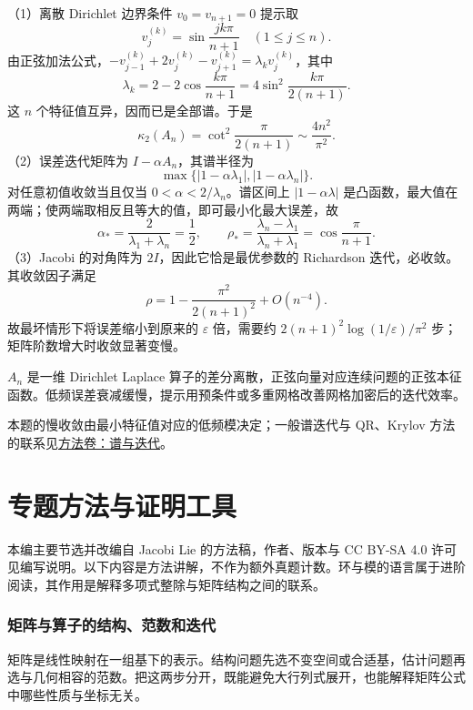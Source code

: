 \documentclass[UTF8,12pt,a4paper,fontset=fandol]{ctexart}
\begin{document}
\begin{solve}

（1）离散 Dirichlet 边界条件 $v_0=v_{n+1}=0$ 提示取
\[
v_j^{(k)}=\sin\frac{jk\pi}{n+1}\quad(1\le j\le n).
\]
由正弦加法公式，$-v_{j-1}^{(k)}+2v_j^{(k)}-v_{j+1}^{(k)}=\lambda_kv_j^{(k)}$，其中
\[
\lambda_k=2-2\cos\frac{k\pi}{n+1}=4\sin^2\frac{k\pi}{2(n+1)}.
\]
这 $n$ 个特征值互异，因而已是全部谱。于是
\[
\kappa_2(A_n)=\cot^2\frac\pi{2(n+1)}\sim\frac{4n^2}{\pi^2}.
\]
（2）误差迭代矩阵为 $I-\alpha A_n$，其谱半径为
\[
\max\{|1-\alpha\lambda_1|,|1-\alpha\lambda_n|\}.
\]
对任意初值收敛当且仅当 $\boxed{0<\alpha<2/\lambda_n}$。谱区间上 $|1-\alpha\lambda|$ 是凸函数，最大值在两端；使两端取相反且等大的值，即可最小化最大误差，故
\[
\boxed{\alpha_*=\frac2{\lambda_1+\lambda_n}=\frac12},\qquad
\rho_*=\frac{\lambda_n-\lambda_1}{\lambda_n+\lambda_1}=\cos\frac\pi{n+1}.
\]
（3）Jacobi 的对角阵为 $2I$，因此它恰是最优参数的 Richardson 迭代，必收敛。其收敛因子满足
\[
\rho=1-\frac{\pi^2}{2(n+1)^2}+O(n^{-4}).
\]
故最坏情形下将误差缩小到原来的 $\varepsilon$ 倍，需要约 $2(n+1)^2\log(1/\varepsilon)/\pi^2$ 步；矩阵阶数增大时收敛显著变慢。

\end{solve}

\begin{remark}[方法与条件]

$A_n$ 是一维 Dirichlet Laplace 算子的差分离散，正弦向量对应连续问题的正弦本征函数。低频误差衰减缓慢，提示用预条件或多重网格改善网格加密后的迭代效率。

本题的慢收敛由最小特征值对应的低频模决定；一般谱迭代与 QR、Krylov 方法的联系见\hyperref[app:linear-iteration]{方法卷：谱与迭代}。

\end{remark}

\part{专题方法与证明工具}

本编主要节选并改编自 Jacobi Lie 的方法稿，作者、版本与 CC BY-SA 4.0 许可见编写说明。以下内容是方法讲解，不作为额外真题计数。环与模的语言属于进阶阅读，其作用是解释多项式整除与矩阵结构之间的联系。



\section{矩阵与算子的结构、范数和迭代}

矩阵是线性映射在一组基下的表示。结构问题先选不变空间或合适基，估计问题再选与几何相容的范数。把这两步分开，既能避免大行列式展开，也能解释矩阵公式中哪些性质与坐标无关。
\end{document}
